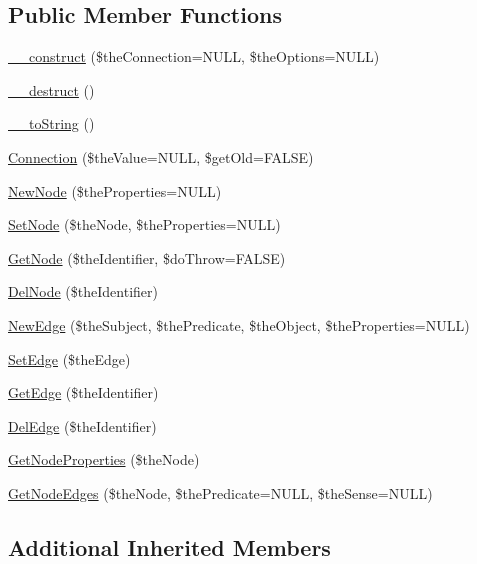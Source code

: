 \subsection*{Public Member Functions}
\begin{DoxyCompactItemize}
\item 
\hyperlink{class_c_neo4j_graph_ac73874c959201b5204020ab9f2df9ed8}{\-\_\-\-\_\-construct} (\$the\-Connection=N\-U\-L\-L, \$the\-Options=N\-U\-L\-L)
\item 
\hyperlink{class_c_neo4j_graph_a914022964c276ca0107345631e109382}{\-\_\-\-\_\-destruct} ()
\item 
\hyperlink{class_c_neo4j_graph_a6891f707fb08e36662d3d0c613f0da93}{\-\_\-\-\_\-to\-String} ()
\item 
\hyperlink{class_c_neo4j_graph_a651c716b812ce43b2590a5a7aa1f3efb}{Connection} (\$the\-Value=N\-U\-L\-L, \$get\-Old=F\-A\-L\-S\-E)
\item 
\hyperlink{class_c_neo4j_graph_a7da11906570d368e071fc7f858a751ca}{New\-Node} (\$the\-Properties=N\-U\-L\-L)
\item 
\hyperlink{class_c_neo4j_graph_a549a7280a0e5c181c21a68ffd49bd020}{Set\-Node} (\$the\-Node, \$the\-Properties=N\-U\-L\-L)
\item 
\hyperlink{class_c_neo4j_graph_ac42e2b030c642d9d04f3b5f0113fe9a2}{Get\-Node} (\$the\-Identifier, \$do\-Throw=F\-A\-L\-S\-E)
\item 
\hyperlink{class_c_neo4j_graph_a5833f27249ff962fb93ce840117172b0}{Del\-Node} (\$the\-Identifier)
\item 
\hyperlink{class_c_neo4j_graph_a9b9b2e18e4987c394406f5a086058757}{New\-Edge} (\$the\-Subject, \$the\-Predicate, \$the\-Object, \$the\-Properties=N\-U\-L\-L)
\item 
\hyperlink{class_c_neo4j_graph_a8688944572100526305443cd23f78a63}{Set\-Edge} (\$the\-Edge)
\item 
\hyperlink{class_c_neo4j_graph_a0352e11f4a5e856a09c19403c7a2e87b}{Get\-Edge} (\$the\-Identifier)
\item 
\hyperlink{class_c_neo4j_graph_a117ae458caca68a726f31ec9a5492ead}{Del\-Edge} (\$the\-Identifier)
\item 
\hyperlink{class_c_neo4j_graph_a2f999a5fff32d9b2317b4cf212abebff}{Get\-Node\-Properties} (\$the\-Node)
\item 
\hyperlink{class_c_neo4j_graph_a853373c66550ba67c2d1914f0aefbd33}{Get\-Node\-Edges} (\$the\-Node, \$the\-Predicate=N\-U\-L\-L, \$the\-Sense=N\-U\-L\-L)
\end{DoxyCompactItemize}
\subsection*{Additional Inherited Members}


